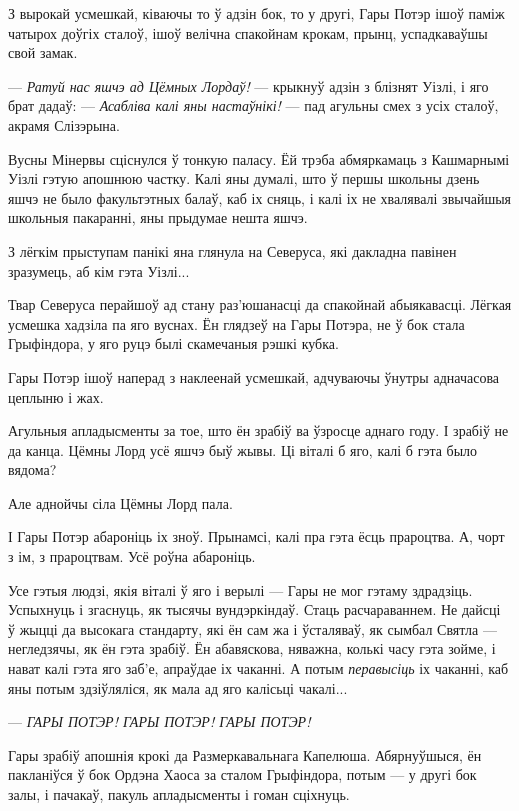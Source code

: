 З вырокай усмешкай, ківаючы то ў адзін бок, то у другі, Гары Потэр ішоў 
паміж чатырох доўгіх сталоў, ішоў велічна спакойнам крокам, прынц, успадкаваўшы
свой замак. 

--- \emph{Ратуй нас яшчэ ад Цёмных Лордаў!} --- крыкнуў адзін з блізнят Уізлі, 
і яго брат дадаў: --- \emph{Асабліва калі яны настаўнікі!} --- пад агульны смех
з усіх сталоў, акрамя Слізэрына.

Вусны Мінервы сціснулся ў тонкую паласу. Ёй трэба абмяркамаць з Кашмарнымі Уізлі
гэтую апошнюю частку. Калі яны думалі, што ў першы школьны дзень яшчэ не было 
факультэтных балаў, каб іх сняць, і калі іх не хвалявалі звычайшыя школьныя пакаранні,
яны прыдумае нешта яшчэ.

З лёгкім прыступам панікі яна глянула на Северуса, які дакладна павінен зразумець, аб кім гэта Уізлі...

Твар Северуса перайшоў ад стану раз'юшанасці да спакойнай абыякавасці. Лёгкая 
усмешка хадзіла па яго вуснах. Ён глядзеў на Гары Потэра, не ў бок стала Грыфіндора,
у яго руцэ былі скамечаныя рэшкі кубка.

\later

Гары Потэр ішоў наперад з наклеенай усмешкай, адчуваючы ўнутры адначасова 
цеплыню і жах.

Агульныя апладысменты за тое, што ён зрабіў ва ўзросце аднаго году. І зрабіў не да канца.
Цёмны Лорд усё яшчэ быў жывы. Ці віталі б яго, калі б гэта было вядома?

Але аднойчы сіла Цёмны Лорд пала.

І Гары Потэр абароніць іх зноў. Прынамсі, калі пра гэта ёсць прароцтва. А, чорт з 
ім, з прароцтвам. Усё роўна абароніць.

Усе гэтыя людзі, якія віталі ў яго і верылі --- Гары не мог гэтаму здрадзіць.
Успыхнуць і згаснуць, як тысячы вундэркіндаў. Стаць расчараваннем. Не дайсці 
ў жыцці да высокага стандарту, які ён сам жа і ўсталяваў, як сымбал Святла ---
негледзячы, як ён гэта зрабіў. Ён абавяскова, няважна, колькі часу гэта зойме, 
і нават калі гэта яго заб'е, апраўдае іх чаканні. А потым \emph{перавысіць}
іх чаканні, каб яны потым здзіўляліся, як мала ад яго калісьці чакалі...

--- \emph{ГАРЫ ПОТЭР! ГАРЫ ПОТЭР! ГАРЫ ПОТЭР!}

Гары зрабіў апошнія крокі да Размеркавальнага Капелюша. Абярнуўшыся, ён пакланіўся ў бок
Ордэна Хаоса за сталом Грыфіндора, потым --- у другі бок залы, і 
пачакаў, пакуль апладысменты і гоман сціхнуць.

